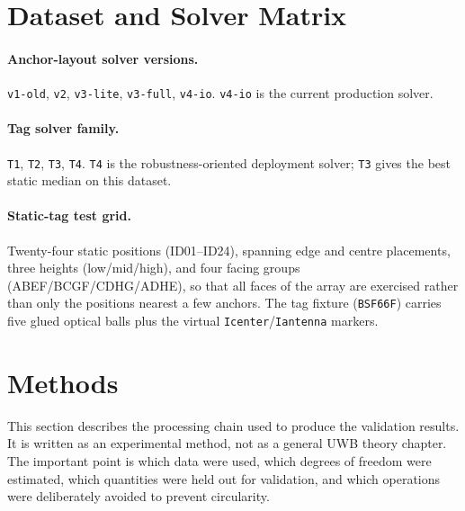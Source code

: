 \documentclass[11pt,a4paper]{article}
\begin{document}
\section{Dataset and Solver Matrix}

\paragraph{Anchor-layout solver versions.} \texttt{v1-old}, \texttt{v2}, \texttt{v3-lite},
\texttt{v3-full}, \texttt{v4-io}. \texttt{v4-io} is the current production solver.

\paragraph{Tag solver family.} \texttt{T1}, \texttt{T2}, \texttt{T3}, \texttt{T4}.
\texttt{T4} is the robustness-oriented deployment solver; \texttt{T3} gives the best static
median on this dataset.

\paragraph{Static-tag test grid.} Twenty-four static positions (ID01--ID24), spanning
edge and centre placements, three heights (low/mid/high), and four facing groups
(ABEF/BCGF/CDHG/ADHE), so that all faces of the array are exercised rather than only the
positions nearest a few anchors. The tag fixture (\texttt{BSF66F}) carries five glued
optical balls plus the virtual \texttt{Icenter}/\texttt{Iantenna} markers.

\section{Methods}
\label{sec:methods}

This section describes the processing chain used to produce the validation results. It is
written as an experimental method, not as a general UWB theory chapter. The important point
is which data were used, which degrees of freedom were estimated, which quantities were held
out for validation, and which operations were deliberately avoided to prevent circularity.
\end{document}
